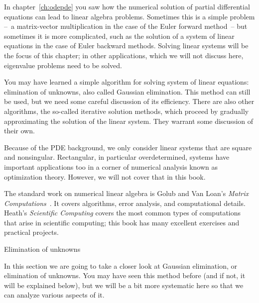 
In chapter~\ref{ch:odepde} you saw how the numerical solution of
partial differential equations can lead to linear algebra
problems. Sometimes this is a simple problem --~a matrix-vector
multiplication in the case of the Euler forward method~-- but
sometimes it is more complicated, such as the solution of a system of
linear equations in the case of Euler backward methods. Solving linear
systems will be the focus of this chapter; in other applications,
which we will not discuss here, eigenvalue problems need to be solved.

You may have learned a simple
algorithm for solving system of linear equations: elimination of
unknowns, also called Gaussian elimination. This method can still be
used, but we need some careful discussion of its efficiency. There are
also other algorithms, the so-called iterative solution methods, which
proceed by gradually approximating the solution of the linear
system. They warrant some discussion of their own.

Because of the PDE background, we only consider linear systems that
are square and nonsingular. Rectangular, in particular overdetermined,
systems have important applications too in a corner of numerical
analysis known as optimization theory. However, we will not cover
that in this book.

The standard work on numerical linear algebra is Golub and Van Loan's
{\it Matrix Computations}~\cite{GoVL:matcomp}.  It covers algorithms,
error analysis, and computational details.  Heath's {\it Scientific
  Computing} covers the most common types of computations that arise
in scientific computing; this book has many excellent exercises and
practical projects.

 {Elimination of unknowns}
\label{sec:gauss-example}

In this section we are going to take a closer look at Gaussian
elimination, or elimination of unknowns. You may have seen this method
before (and if not, it will be explained below), but we will be a bit
more systematic here so that we can analyze various aspects of it.

